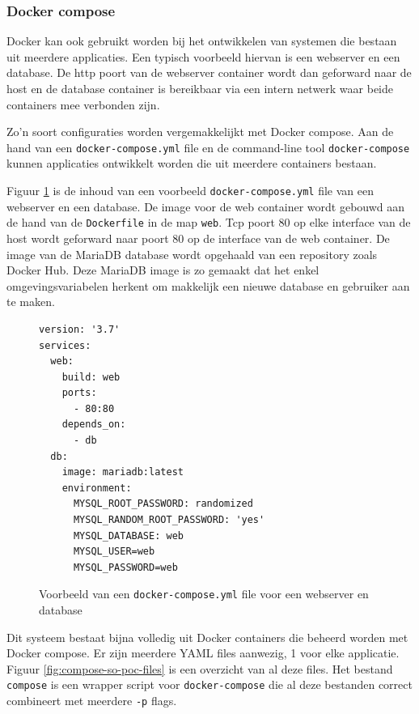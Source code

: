 \documentclass[a4paper,12pt]{report}
\begin{document}
\subsubsection{Docker compose}
Docker kan ook gebruikt worden bij het ontwikkelen van systemen die bestaan uit meerdere applicaties.
Een typisch voorbeeld hiervan is een webserver en een database.
De http poort van de webserver container wordt dan geforward naar de host en de database container is bereikbaar via een intern netwerk waar beide containers mee verbonden zijn.

Zo'n soort configuraties worden vergemakkelijkt met Docker compose.
Aan de hand van een \lstinline|docker-compose.yml| file en de command-line tool \lstinline|docker-compose| kunnen applicaties ontwikkelt worden die uit meerdere containers bestaan.
\autocite{docker:compose}

Figuur \ref{fig:compose-web-example} is de inhoud van een voorbeeld \lstinline|docker-compose.yml| file van een webserver en een database.
De image voor de web container wordt gebouwd aan de hand van de \lstinline|Dockerfile| in de map \lstinline|web|.
Tcp poort 80 op elke interface van de host wordt geforward naar poort 80 op de interface van de web container.
De image van de MariaDB database wordt opgehaald van een repository zoals Docker Hub.
Deze MariaDB image is zo gemaakt dat het enkel omgevingsvariabelen herkent om makkelijk een nieuwe database en gebruiker aan te maken.

\begin{figure}[H]
  \begin{lstlisting}
version: '3.7'
services:
  web:
    build: web
    ports:
      - 80:80
    depends_on:
      - db
  db:
    image: mariadb:latest
    environment:
      MYSQL_ROOT_PASSWORD: randomized
      MYSQL_RANDOM_ROOT_PASSWORD: 'yes'
      MYSQL_DATABASE: web
      MYSQL_USER=web
      MYSQL_PASSWORD=web
  \end{lstlisting}
  \caption{Voorbeeld van een \lstinline|docker-compose.yml| file voor een webserver en database}
  \label{fig:compose-web-example}
\end{figure}

Dit systeem bestaat bijna volledig uit Docker containers die beheerd worden met Docker compose.
Er zijn meerdere YAML files aanwezig, 1 voor elke applicatie.
Figuur \ref{fig:compose-so-poc-files} is een overzicht van al deze files.
Het bestand \lstinline|compose| is een wrapper script voor \lstinline{docker-compose} die al deze bestanden correct combineert met meerdere \lstinline|-p| flags.
\end{document}
